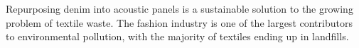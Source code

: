 Repurposing denim into acoustic panels is a sustainable solution to the growing problem of textile waste. The fashion industry is one of the largest contributors to environmental pollution, with the majority of textiles ending up in landfills.  
